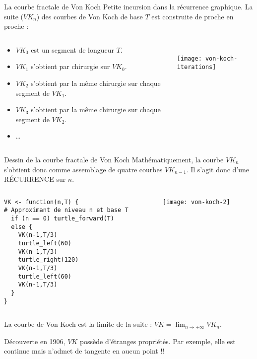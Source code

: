 \documentclass[10pt]{beamer}
\begin{document}
\begin{frame}{La courbe fractale de Von Koch}
  Petite incursion dans la récurrence graphique. La suite ($VK_n $) des courbes de Von Koch de base $T$ est construite de proche en proche :


\begin{columns}[c]
\begin{column}{0.58\textwidth}
  \begin{itemize}
\item $VK_0$ est un segment de longueur $T$. \vspace{0.5cm}
\item $VK_1$ s'obtient par chirurgie sur $VK_0$. \vspace{0.5cm}
\item $VK_2$ s'obtient par la même chirurgie sur chaque segment de $VK_1$. \vspace{0.5cm}
\item $VK_3$ s'obtient par la même chirurgie sur chaque segment de $VK_2$. \vspace{0.5cm}
\item \dots

\end{itemize}
\end{column}
\begin{column}{0.38\textwidth}
  \vspace{0.25cm} \\
  \texttt{[image: von-koch-iterations]}
\end{column}
\end{columns}
\end{frame}

\begin{frame}[fragile]{Dessin de la courbe fractale de Von Koch}
  Mathématiquement, la courbe $VK_n$ s'obtient donc comme assemblage de quatre courbes $VK_{n-1}$.
  Il s'agit donc d'une RÉCURRENCE sur $n$.

\begin{columns}[c]
\begin{column}{0.6\textwidth}
  \begin{lstlisting}[style=editor]
VK <- function(n,T) {
# Approximant de niveau n et base T
  if (n == 0) turtle_forward(T)
  else {
    VK(n-1,T/3)
    turtle_left(60)
    VK(n-1,T/3)
    turtle_right(120)
    VK(n-1,T/3)
    turtle_left(60)
    VK(n-1,T/3)
  }
}
  \end{lstlisting}
\end{column}
\begin{column}{0.38\textwidth}
  \texttt{[image: von-koch-2]}
\end{column}
\end{columns}
La courbe de Von Koch est la limite de la suite : $VK = \lim_{n \rightarrow + \infty} VK_n$.

Découverte en 1906, $VK$ possède d'étranges propriétés. Par exemple, elle est continue mais n'admet de tangente en aucun point !!
\end{frame}
\end{document}
